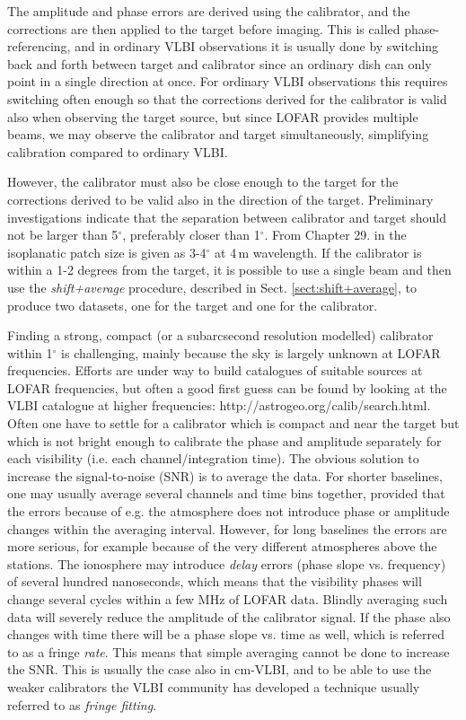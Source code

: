 The amplitude and phase errors are derived using the calibrator, and the
corrections are then applied to the target before imaging. This is called
phase-referencing, and in ordinary VLBI observations it is usually done by
switching back and forth between target and calibrator since an ordinary dish
can only point in a single direction at once. For ordinary VLBI observations
this requires switching often enough so that the corrections derived for the
calibrator is valid also when observing the target source, but since LOFAR
provides multiple beams, we may observe the calibrator and target
simultaneously, simplifying calibration compared to ordinary VLBI. 

However, the calibrator must also be close enough to the target 
for the corrections derived to be valid also in the direction of the target.
Preliminary investigations indicate that the separation between calibrator
and target should not be larger than 5$^\circ$, preferably closer than 1$^\circ$.
From Chapter 29. in \cite{NRAO} the isoplanatic patch size is given as 3-4$^\circ$
at 4\,m wavelength.
If the calibrator is within a 1-2 degrees from the target,
it is possible to use a single beam and then use the \emph{shift+average} procedure,
described in Sect. \ref{sect:shift+average}, to produce two datasets, one for the 
target and one for the calibrator. 

Finding a strong, compact (or a subarcsecond resolution modelled) calibrator within
1$^\circ$ is challenging, mainly because the sky is largely unknown at LOFAR
frequencies. Efforts are under way to build catalogues of suitable sources at
LOFAR frequencies, but often a good first guess can be found by looking at the
VLBI catalogue at higher frequencies: http://astrogeo.org/calib/search.html.
Often one have to settle for a calibrator which is compact and near the target
but which is not bright enough to calibrate the phase and amplitude separately
for each visibility (i.e. each channel/integration time).  The obvious solution
to increase the signal-to-noise (SNR) is to average the data. For shorter
baselines, one may usually average several channels and time bins together,
provided that the errors because of e.g. the atmosphere does not introduce
phase or amplitude changes within the averaging interval. However, for long
baselines the errors are more serious, for example because of the very
different atmospheres above the stations. The ionosphere may introduce
\emph{delay} errors (phase slope vs. frequency) of several hundred nanoseconds,
which means that the visibility phases will change several cycles within a few
MHz of LOFAR data. Blindly averaging such data will severely reduce the
amplitude of the calibrator signal. If the phase also changes with time there
will be a phase slope vs. time as well, which is referred to as a fringe
\emph{rate}.  This means that simple averaging cannot be done to increase the
SNR. This is usually the case also in cm-VLBI, and to be able to use the weaker
calibrators the VLBI community has developed a technique usually referred to as
\emph{fringe fitting}. 

